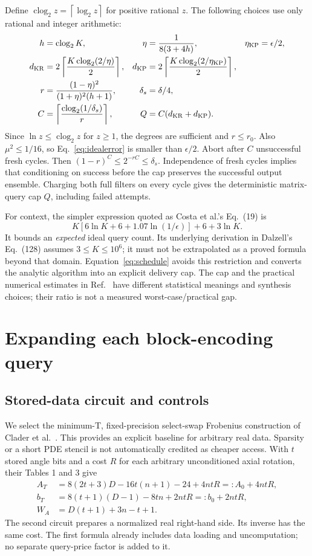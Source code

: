\documentclass[11pt]{article}
\newcommand{\ceil}[1]{\left\lceil #1\right\rceil}
\newcommand{\clog}{\operatorname{clog}_2}
\begin{document}
Define $\clog z=\ceil{\log_2z}$ for positive rational $z$. The following choices use only rational and integer arithmetic:
\begin{equation}\label{eq:schedule}
\begin{aligned}
 h&=\clog K,&\eta&=\frac1{8(3+4h)},&\eta_{\rm KP}&=\epsilon/2,\\
 d_{\rm KR}&=2\ceil{\frac{K\clog(2/\eta)}2},&
 d_{\rm KP}&=2\ceil{\frac{K\clog(2/\eta_{\rm KP})}2},\\
 r&=\frac{(1-\eta)^2}{(1+\eta)^2(h+1)},&\delta_s&=\delta/4,\\
 C&=\ceil{\frac{\clog(1/\delta_s)}r},& Q&=C(d_{\rm KR}+d_{\rm KP}).
\end{aligned}
\end{equation}
Since $\ln z\le\clog z$ for $z\ge1$, the degrees are sufficient and $r\le r_0$. Also $\mu^2\le1/16$, so Eq.~\eqref{eq:idealerror} is smaller than $\epsilon/2$. Abort after $C$ unsuccessful fresh cycles. Then $(1-r)^C\le2^{-rC}\le\delta_s$. Independence of fresh cycles implies that conditioning on success before the cap preserves the successful output ensemble. Charging both full filters on every cycle gives the deterministic matrix-query cap $Q$, including failed attempts.

For context, the simpler expression quoted as Costa et al.'s Eq.~(19) is
\begin{equation}\label{eq:costa}
 K[6\ln K+6+1.07\ln(1/\epsilon)]+6+3\ln K.
\end{equation}
It bounds an \emph{expected} ideal query count. Its underlying derivation in Dalzell's Eq.~(128) assumes $3\le K\le10^6$; it must not be extrapolated as a proved formula beyond that domain. Equation~\eqref{eq:schedule} avoids this restriction and converts the analytic algorithm into an explicit delivery cap. The cap and the practical numerical estimates in Ref.~\cite{costa} have different statistical meanings and synthesis choices; their ratio is not a measured worst-case/practical gap.

\section{Expanding each block-encoding query}
\subsection{Stored-data circuit and controls}
We select the minimum-T, fixed-precision select-swap Frobenius construction of Clader et al.~\cite{clader}. This provides an explicit baseline for arbitrary real data. Sparsity or a short PDE stencil is not automatically credited as cheaper access. With $t$ stored angle bits and a cost $R$ for each arbitrary unconditioned axial rotation, their Tables 1 and 3 give
\begin{align}
 A_T&=8(2t+3)D-16t(n+1)-24+4ntR=:A_0+4ntR,\\
 b_T&=8(t+1)(D-1)-8tn+2ntR=:b_0+2ntR,\\
 W_A&=D(t+1)+3n-t+1.
\end{align}
The second circuit prepares a normalized real right-hand side. Its inverse has the same cost. The first formula already includes data loading and uncomputation; no separate query-price factor is added to it.
\end{document}
